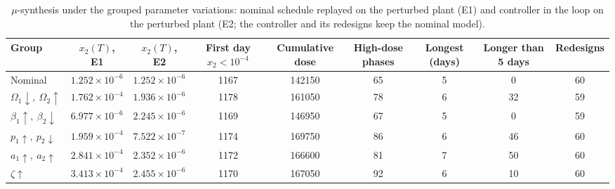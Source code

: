 \begin{table}[htbp]
\centering
\caption{$\mu$-synthesis under the grouped parameter variations: nominal schedule replayed on the perturbed plant (E1) and controller in the loop on the perturbed plant (E2; the controller and its redesigns keep the nominal model).}
\label{tab:mu_e2}
\small
\begin{tabular}{lcccccccc}
\toprule
Group & $x_2(T)$, E1 & $x_2(T)$, E2 & First day $x_2<10^{-4}$ & Cumulative dose & High-dose phases & Longest (days) & Longer than 5 days & Redesigns \\
\midrule
Nominal & $1.252{\times}10^{-6}$ & $1.252{\times}10^{-6}$ & 1167 & 142150 & 65 & 5 & 0 & 60 \\
$\Omega_1 \downarrow,\ \Omega_2 \uparrow$ & $1.762{\times}10^{-4}$ & $1.936{\times}10^{-6}$ & 1178 & 161050 & 78 & 6 & 32 & 59 \\
$\beta_1 \uparrow,\ \beta_2 \downarrow$ & $6.977{\times}10^{-6}$ & $2.245{\times}10^{-6}$ & 1169 & 146950 & 67 & 5 & 0 & 59 \\
$p_1 \uparrow,\ p_2 \downarrow$ & $1.959{\times}10^{-4}$ & $7.522{\times}10^{-7}$ & 1174 & 169750 & 86 & 6 & 46 & 60 \\
$a_1 \uparrow,\ a_2 \uparrow$ & $2.841{\times}10^{-4}$ & $2.352{\times}10^{-6}$ & 1172 & 166600 & 81 & 7 & 50 & 60 \\
$\zeta \uparrow$ & $3.413{\times}10^{-4}$ & $2.455{\times}10^{-6}$ & 1170 & 167050 & 92 & 6 & 10 & 60 \\
\bottomrule
\end{tabular}
\end{table}
